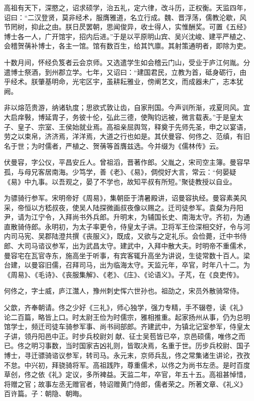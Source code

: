 \documentclass[12pt,UTF8]{ctexbook}
\begin{document}
高祖有天下，深愍之，诏求硕学，治五礼，定六律，改斗历，正权衡。天监四年，诏曰：“二汉登贤，莫非经术，服膺雅道，名立行成。魏、晋浮荡，儒教沦歇，风节罔树，抑此之由。朕日昃罢朝，思闻俊异，收士得人，实惟酬奖。可置《五经》博士各一人，广开馆宇，招内后进。”于是以平原明山宾、吴兴沈峻、建平严植之、会稽贺蒨补博士，各主一馆。馆有数百生，给其饩廪。其射策通明者，即除为吏。

十数月间，怀经负笈者云会京师。又选遣学生如会稽云门山，受业于庐江何胤。分遣博士祭酒，到州郡立学。七年，又诏曰：“建国君民，立教为首，砥身砺行，由乎经术。朕肇基明命，光宅区宇，虽耕耘雅业，傍阐艺文，而成器未广，志本犹阙。

非以熔范贵游，纳诸轨度；思欲式敦让齿，自家刑国。今声训所渐，戎夏同风。宜大启痒斅，博延胄子，务彼十伦，弘此三德，使陶钧远被，微言载表。”于是皇太子、皇子、宗室、王侯始就业焉。高祖亲屈舆驾，释奠于先师先圣，申之以宴语，劳之以束帛，济济焉，洋洋焉，大道之行也如是。其伏曼容、何佟之、范缜，有旧名于世；为时儒者，严植之、贺蒨等首膺兹选。今并缀为《儒林传》云。

伏曼容，字公仪，平昌安丘人。曾祖滔，晋著作郎。父胤之，宋司空主簿。曼容早孤，与母兄客居南海。少笃学，善《老》、《易》，倜傥好大言，常云：“何晏疑《易》中九事。以吾观之，晏了不学也，故知平叔有所短。”聚徒教授以自业。

为骠骑行参军。宋明帝好《周易》，集朝臣于清暑殿讲，诏曼容执经。曼容素美风采，帝恒以方嵇叔夜，使吴人陆探微画叔夜像以赐之。迁司徒参军。袁粲为丹阳尹，请为江宁令，入拜尚书外兵郎。升明末，为辅国长史、南海太守。齐初，为通直散骑侍郎。永明初，为太子率更令，侍皇太子讲。卫将军王俭深相交好，令与河内司马宪、吴郡陆澄共撰《丧服义》，既成，又欲与之定礼乐。会俭薨，迁中书侍郎、大司马谘议参军，出为武昌太守。建武中，入拜中散大夫。时明帝不重儒术，曼容宅在瓦官寺东，施高坐于听事，有宾客辄升高坐为讲说，生徒常数十百人。梁台建，以曼容旧儒，召拜司马，出为临海太守。天监元年，卒官，时年八十二。为《周易》、《毛诗》、《丧服集解》、《老》、《庄》、《论语义》。子芃，在《良吏传》。

何佟之，字士威，庐江灊人，豫州刺史恽六世孙也。祖劭之，宋员外散骑常侍。

父歆，齐奉朝请。佟之少好《三礼》，师心独学，强力专精，手不辍卷，读《礼》论二百篇，略皆上口。时太尉王俭为时儒宗，雅相推重。起家扬州从事，仍为总明馆学士，频迁司徒车骑参军事、尚书祠部郎。齐建武中，为镇北记室参军，侍皇太子讲，领丹阳邑中正。时步兵校尉刘献、征士吴苞皆已卒，京邑硕儒，唯佟之而已。佟之明习事数，当时国家吉凶礼则，皆取决焉，名重于世。历步兵校尉、国子博士，寻迁骠骑谘议参军，转司马。永元末，京师兵乱，佟之常集诸生讲论，孜孜不怠。中兴初，拜骁骑将军。高祖践阼，尊重儒术，以佟之为尚书左丞。是时百度草创，佟之依《礼》定议，多所裨益。天监二年，卒官，年五十五。高祖甚悼惜，将赠之官；故事左丞无赠官者，特诏赠黄门侍郎，儒者荣之。所著文章、《礼义》百许篇。子：朝隐、朝晦。
\end{document}
